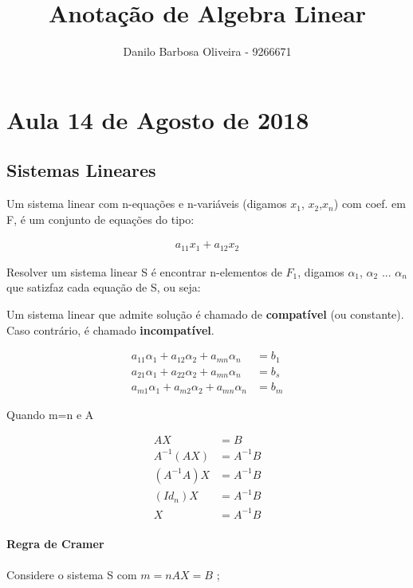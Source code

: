 \documentclass[12pt,a4paper]{article}
\author{Danilo Barbosa Oliveira - 9266671}
\title{Anotação de Algebra Linear}
\begin{document}
\maketitle
\newpage

\tableofcontents
\newpage

\section{Aula 14 de Agosto de 2018} 


\subsection{Sistemas Lineares}

Um sistema linear com n-equações e n-variáveis (digamos $x_1$, $x_2$,$x_n$) com coef. em F, é um conjunto de equações do tipo:

\begin{align*}
a_{11}x_1 + a_{12}x_2
\end{align*}

Resolver um sistema linear S é encontrar n-elementos de $F_1$, digamos $\alpha_1$, $\alpha_2$ ... $\alpha_n$ que satizfaz cada equação de S, ou seja:



Um sistema linear que admite solução é chamado de \textbf{compatível} (ou constante). Caso contrário, é chamado \textbf{incompatível}.

\begin{align*}
a_{11}\alpha_1 + a_{12}\alpha_2 + a_{mn}\alpha_n &= b_1\\
a_{21}\alpha_1 + a_{22}\alpha_2 + a_{mn}\alpha_n &= b_s\\
a_{m1}\alpha_1 + a_{m2}\alpha_2 + a_{mn}\alpha_n &= b_m
\end{align*}

Quando m=n e A 

\begin{align*}
AX &= B\\
A^{-1}(AX) &= A^{-1}B\\
(A^{-1}A)X &= A^{-1}B\\
(Id_n)X &= A^{-1}B\\
X &= A^{-1}B
\end{align*}

\paragraph{Regra de Cramer}

Considere o sistema S com $m=n  AX=B$ ; 
\end{document}
